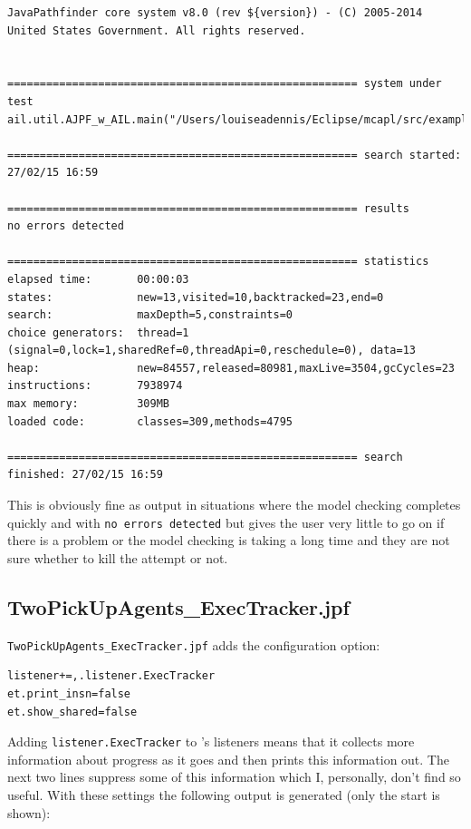 \documentclass[a4]{article}
\begin{document}
\begin{verbatim}
JavaPathfinder core system v8.0 (rev ${version}) - (C) 2005-2014 United States Government. All rights reserved.


====================================================== system under test
ail.util.AJPF_w_AIL.main("/Users/louiseadennis/Eclipse/mcapl/src/examples/gwendolen/ajpf_tutorials/tutorial2/TwoPickUpAgents.ail","/Users/louiseadennis/Eclipse/mcapl/src/examples/gwendolen/ajpf_tutorials/tutorial2/PickUpAgent.psl","1")

====================================================== search started: 27/02/15 16:59

====================================================== results
no errors detected

====================================================== statistics
elapsed time:       00:00:03
states:             new=13,visited=10,backtracked=23,end=0
search:             maxDepth=5,constraints=0
choice generators:  thread=1 (signal=0,lock=1,sharedRef=0,threadApi=0,reschedule=0), data=13
heap:               new=84557,released=80981,maxLive=3504,gcCycles=23
instructions:       7938974
max memory:         309MB
loaded code:        classes=309,methods=4795

====================================================== search finished: 27/02/15 16:59
\end{verbatim}

This is obviously fine as output in situations where the model checking completes quickly and with \texttt{no errors detected} but gives the user very little to go on if there is a problem or the model checking is taking a long time and they are not sure whether to kill the attempt or not.

\subsection{TwoPickUpAgents\_ExecTracker.jpf}

\texttt{TwoPickUpAgents\_ExecTracker.jpf} adds the configuration option:

\begin{verbatim}
listener+=,.listener.ExecTracker
et.print_insn=false
et.show_shared=false
\end{verbatim}

Adding \texttt{listener.ExecTracker} to \jpf's listeners means that it collects more information about progress as it goes and then prints this information out.  The next two lines suppress some of this information which I, personally, don't find so useful.  With these settings the following output is generated (only the start is shown):
\end{document}
